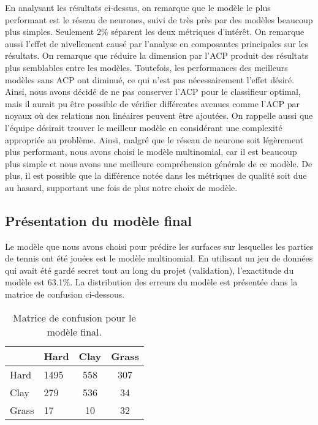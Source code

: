 En analysant les résultats ci-dessus, on remarque que le modèle le plus performant est le réseau de neurones, suivi de très près par des modèles beaucoup plus simples. Seulement 2\% séparent les deux métriques d'intérêt. On remarque aussi l'effet de nivellement causé par l'analyse en composantes principales sur les résultats. On remarque que réduire la dimension par l'ACP produit des résultats plus semblables entre les modèles. Toutefois, les performances des meilleurs modèles sans ACP ont diminué, ce qui n'est pas nécessairement l'effet désiré. Ainsi, nous avons décidé de ne pas conserver l'ACP pour le classifieur optimal, mais il aurait pu être possible de vérifier différentes avenues comme l'ACP par noyaux où des relations non linéaires peuvent être ajoutées. On rappelle aussi que l'équipe désirait trouver le meilleur modèle en considérant une complexité appropriée au problème. Ainsi, malgré que le réseau de neurone soit légèrement plus performant, nous avons choisi le modèle multinomial, car il est beaucoup plus simple et nous avons une meilleure compréhension générale de ce modèle. De plus, il est possible que la différence notée dans les métriques de qualité soit due au hasard, supportant une fois de plus notre choix de modèle. 
 
\subsection{Présentation du modèle final}
Le modèle que nous avons choisi pour prédire les surfaces sur lesquelles les parties de tennis ont été jouées est le modèle multinomial. En utilisant un jeu de données qui avait été gardé secret tout au long du projet (validation), l'exactitude du modèle est 63.1\%. La distribution des erreurs du modèle est présentée dans la matrice de confusion ci-dessous.

\begin{table}[H]
	
	\caption{\label{tab:matrice_confusion}Matrice de confusion pour le modèle final.}
	\centering
	\begin{tabular}[t]{llcc}
		\hiderowcolors
		\toprule
		& Hard & Clay & Grass\\
		\midrule
		\showrowcolors
		Hard & 1495 & 558 & 307\\
		Clay & 279 & 536 & 34\\
		Grass & 17 & 10 & 32\\
		\bottomrule
	\end{tabular}
\end{table}


